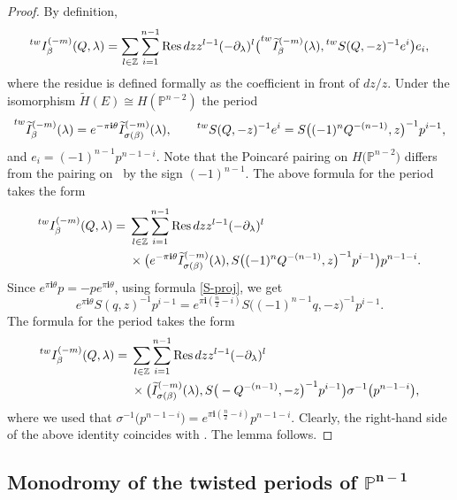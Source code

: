 \documentclass[10pt,a4paper]{article}
\numberwithin{equation}{section}
\newcommand{\leftexp}[2]{{\vphantom{#2}}^{#1}{#2}}
\newcommand{\ZZ}{\mathbb{Z}}
\newcommand{\PP}{\mathbb{P}}
\newcommand{\ii}{\mathbf{i}}
\begin{document}
\begin{proof}
By definition,
\[
\leftexp{tw}{I}^{(-m)}_\beta(Q,\lambda) =
\sum_{l\in \ZZ} \sum_{i=1}^{n-1}
\operatorname{Res} dz z^{l-1} (-\partial_\lambda)^l
\big(
\leftexp{tw}{\widetilde{I}}^{(-m)}_\beta(\lambda),
\leftexp{tw}{S}(Q,-z)^{-1} e^i
\big) e_i,
\]
where the residue is defined formally as the coefficient in front of
$dz/z$. Under the isomorphism $\widetilde{H}(E)\cong H(\PP^{n-2})$ the
period
\begin{gather*}
\leftexp{tw}{\widetilde{I}}^{(-m)}_\beta(\lambda) =
e^{-\pi \ii \theta} \widetilde{I}^{(-m)}_{\sigma(\beta)}(\lambda),
\qquad
\leftexp{tw}{S}(Q,-z)^{-1} e^i = S\big((-1)^n Q^{-(n-1)}, z\big)^{-1} p^{i-1},
\end{gather*}
and $e_i= (-1)^{n-1} p^{n-1-i}$. Note that the Poincar\'e pairing on
$H\big(\PP^{n-2}\big)$ differs from the pairing on~ by the
sign $(-1)^{n-1}$. The above formula for the period takes the form
\begin{align*}
\leftexp{tw}{I}^{(-m)}_\beta(Q,\lambda) ={}&
\sum_{l\in \ZZ} \sum_{i=1}^{n-1}
\operatorname{Res} dz z^{l-1} (-\partial_\lambda)^l\\
&\times
\big(
 e^{-\pi \ii \theta} \widetilde{I}^{(-m)}_{\sigma(\beta)}(\lambda),
S\big((-1)^n Q^{-(n-1)}, z\big)^{-1} p^{i-1}
\big) p^{n-1-i}.
\end{align*}
Since $e^{\pi \ii \theta} p =-p e^{\pi\ii\theta}$, using formula
\eqref{S-proj}, we get
\[
e^{\pi\ii\theta} S(q,z)^{-1} p^{i-1} =
e^{\pi\ii (\frac{n}{2}-i )}
S\big((-1)^{n-1}q,-z\big)^{-1} p^{i-1}.
\]
The formula for the period takes the form
\begin{align*}
\leftexp{tw}{I}^{(-m)}_\beta(Q,\lambda) ={}&
\sum_{l\in \ZZ} \sum_{i=1}^{n-1}
\operatorname{Res} dz z^{l-1} (-\partial_\lambda)^l\\&\times
\big(
\widetilde{I}^{(-m)}_{\sigma(\beta)}(\lambda),
S\big(-Q^{-(n-1)}, -z\big)^{-1} p^{i-1}
\big) \sigma^{-1}\big(p^{n-1-i}\big),
\end{align*}
where we used that
$
\sigma^{-1}\big(p^{n-1-i}\big)=
e^{\pi\ii (\frac{n}{2}-i )} p^{n-1-i}.
$
Clearly, the right-hand side of the above identity coincides with
. The
lemma follows.
\end{proof}

\subsection[Monodromy of the twisted periods of P\^\{n-1\}]{Monodromy of the twisted periods of $\boldsymbol{\PP^{n-1}}$}
\end{document}

